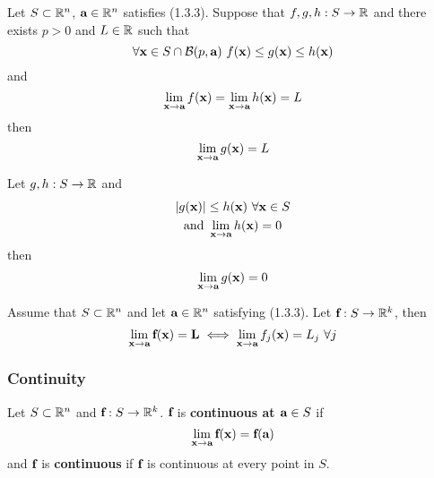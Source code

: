\documentclass[11pt]{article}
\newcommand{\vef}[0]{\ve{f}}
\begin{document}
			\begin{theorem}
				Let $S \subset \mathbb{R}^n$, $\textbf{a} \in \mathbb{R}^n$ satisfies (1.3.3). Suppose that $f, g, h: S \to \mathbb{R}$ and there exists $p > 0$ and $L \in \mathbb{R}$ such that
				\begin{equation}
					\forall \ve{x} \in S \cap \mc{B}(p, \ve{a})\ f(\ve{x}) \leq g(\ve{x}) \leq h(\ve{x})
				\end{equation}
				and 
				\begin{equation}
					\lim_{\textbf{x} \to \textbf{a}} f(\textbf{x}) = \lim_{\textbf{x} \to \textbf{a}} h(\textbf{x}) = L
				\end{equation}
				then 
				\begin{equation}
					\lim_{\textbf{x} \to \textbf{a}} g(\textbf{x}) = L
				\end{equation}
			\end{theorem}
			
			\begin{corollary}
				Let $g, h: S \to \mathbb{R}$ and
				\begin{gather}
					|g(\textbf{x})| \leq h(\textbf{x})\ \forall \textbf{x} \in S \\
					\text{{and }} \lim_{\textbf{x} \to \textbf{a}} h(\textbf{x}) = 0
				\end{gather}
				then 
				\begin{gather}
					\lim_{\textbf{x} \to \textbf{a}} g(\textbf{x}) = 0
				\end{gather}
			\end{corollary}
			
			\begin{theorem}
				Assume that $S \subset \mathbb{R}^n$ and let $\textbf{a} \in \mathbb{R}^n$ satisfying (1.3.3). Let $\vef: S \to \R^k$, then
				\begin{equation}
					\lim_{\vex \to \vea} \vef(\vex) = \ve{L} \iff \lim_{\vex \to \vea} f_j(\vex) = L_j\ \forall j
				\end{equation}
			\end{theorem}
			
			\subsubsection{Continuity}
				\begin{definition}
					Let $S \subset \mathbb{R}^n$ and $\vef: S \to \R^k$. $\vef$ is \textbf{continuous at $\textbf{a} \in S$} if 
					\begin{equation}
						\lim_{\vex \to \vea}\vef(\vex) = \vef(\vea)
					\end{equation}
					and $\vef$ is \textbf{continuous} if $\vef$ is continuous at every point in $S$.
				\end{definition}
			
\end{document}
